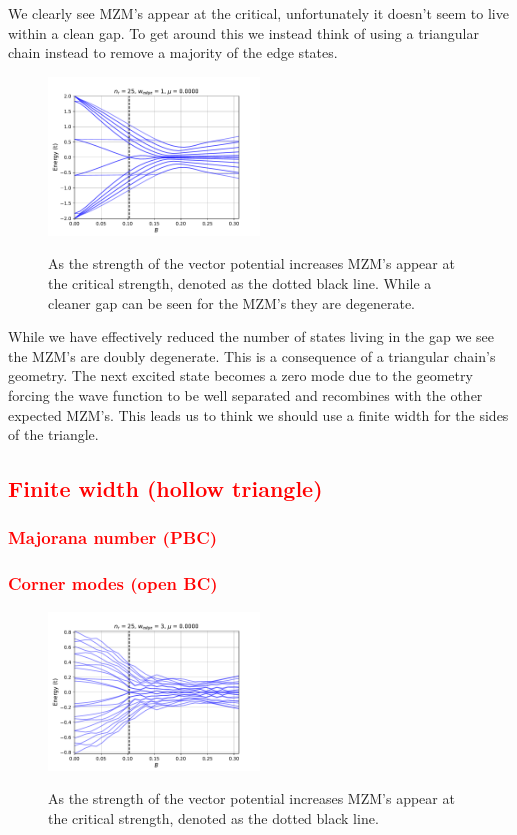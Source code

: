 \documentclass[aps,prb,showpacs,amsmath,amssymb,superscriptaddress]{revtex4-2}
\newcommand{\Red}[1]{\textcolor{red}{#1}}
\begin{document}
We clearly see MZM's appear at the critical, unfortunately it doesn't seem to live within a clean gap.
To get around this we instead think of using a triangular chain instead to remove a majority of the edge states.

\begin{figure}[h]
\includegraphics[width=0.5\textwidth]{./figures/nr-25-w-1-spectral-flow.pdf}
\label{fig: chain-triangle-spectral}
\caption{As the strength of the vector potential increases MZM's appear at the critical strength, denoted as the dotted black line. While a cleaner gap can be seen for the MZM's they are degenerate.}
\end{figure}
While we have effectively reduced the number of states living in the gap we see the MZM's are doubly degenerate.
This is a consequence of a triangular chain's geometry.
The next excited state becomes a zero mode due to the geometry forcing the wave function to be well separated and recombines with the other expected MZM's.
This leads us to think we should use a finite width for the sides of the triangle.

\subsection{\Red{Finite width (hollow triangle)}}

\subsubsection{\Red{Majorana number (PBC)}}

\subsubsection{\Red{Corner modes (open BC)}}

\begin{figure}[]
\includegraphics[width=0.5\textwidth]{./figures/nr-25-w-3-spectral-flow.pdf}
\label{fig: finite-width-triangle-spectral}
\caption{As the strength of the vector potential increases MZM's appear at the critical strength, denoted as the dotted black line.}
\end{figure}
\end{document}
